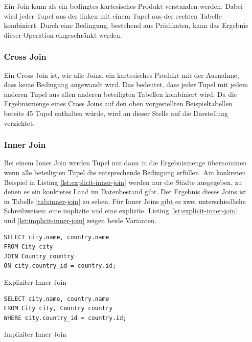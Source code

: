 \documentclass[a4paper]{article}
\begin{document}
Ein Join kann als ein bedingtes kartesisches Produkt verstanden werden. Dabei wird jeder Tupel aus der linken mit einem Tupel aus der rechten Tabelle kombiniert.  Durch eine Bedingung, bestehend aus Prädikaten, kann das Ergebnis dieser Operation eingeschränkt werden.

\subsubsection{Cross Join}
Ein Cross Join ist, wie alle Joins, ein kartesisches Produkt mit der Ausnahme, dass keine Bedingung angewandt wird. Das bedeutet, dass jeder Tupel mit jedem anderen Tupel aus allen anderen beteiligten Tabellen kombiniert wird. Da die Ergebnismenge eines Cross Joins auf den oben vorgestellten Beispieltabellen bereits 45 Tupel enthalten würde, wird an dieser Stelle auf die Darstellung verzichtet.

\newpage
\subsubsection{Inner Join}
Bei einem Inner Join werden Tupel nur dann in die Ergebnismenge übernommen wenn alle beteiligten Tupel die entsprechende Bedingung erfüllen. Am konkreten Beispiel in Listing \ref{lst:explicit-inner-join} werden nur die Städte ausgegeben, zu denen es ein konkretes Land im Datenbestand gibt. Der Ergebnis dieses Joins ist in Tabelle \ref{tab:inner-join} zu sehen. Für Inner Joins gibt es zwei unterschiedliche Schreibweisen: eine implizite und eine explizite. Listing \ref{lst:explicit-inner-join} und \ref{lst:implicit-inner-join} zeigen beide Varianten.

\begin{listing}[H]
\begin{verbatim}
SELECT city.name, country.name 
FROM City city 
JOIN Country country 
ON city.country_id = country.id;
\end{verbatim}
\caption{Expliziter Inner Join}
\label{lst:explicit-inner-join}
\end{listing}

\begin{listing}[H]
\begin{verbatim}
SELECT city.name, country.name 
FROM City city, Country country 
WHERE city.country_id = country.id;
\end{verbatim}
\caption{Impliziter Inner Join}
\label{lst:inplicit-inner-join}
\end{listing}
\end{document}
